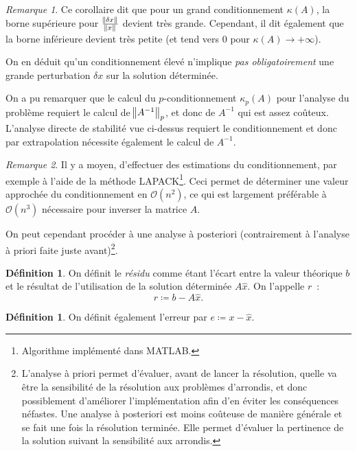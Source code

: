 \documentclass{article}
\theoremstyle{definition}
\newtheorem{déf}[thm]{Définition}
\theoremstyle{remark}
\newtheorem*{rmq}{Remarque}
\begin{document}
		\begin{rmq} Ce corollaire dit que pour un grand conditionnement $\kappa(A)$, la borne supérieure pour $\frac {\norm {\delta x}}{\norm x}$ devient très
		grande. Cependant, il dit également que la borne inférieure devient très petite (et tend vers 0 pour $\kappa(A) \to +\infty$).

		On en déduit qu'un conditionnement élevé n'implique \emph{pas obligatoirement} une grande perturbation $\delta x$ sur la solution déterminée.
		\end{rmq}

		On a pu remarquer que le calcul du $p$-conditionnement $\kappa_p(A)$ pour l'analyse du problème requiert le calcul de $\norm {A^{-1}}_p$, et donc de
		$A^{-1}$ qui est assez coûteux. L'analyse directe de stabilité vue ci-dessus requiert le conditionnement et donc par extrapolation nécessite également
		le calcul de $A^{-1}$. 

		\begin{rmq} Il y a moyen, d'effectuer des estimations du conditionnement, par exemple à l'aide de la méthode LAPACK\footnote{Algorithme implémenté dans
		MATLAB.}. Ceci permet de déterminer une valeur approchée du conditionnement en $\mathcal O(n^2)$, ce qui est largement préférable à $\mathcal O(n^3)$
		nécessaire pour inverser la matrice $A$.
		\end{rmq}

		On peut cependant procéder à une analyse à posteriori (contrairement à l'analyse à priori faite juste avant)\footnote{L'analyse à priori permet d'évaluer,
		avant de lancer la résolution, quelle va être la sensibilité de la résolution aux problèmes d'arrondis, et donc possiblement d'améliorer l'implémentation
		afin d'en éviter les conséquences néfastes. Une analyse à posteriori est moins coûteuse de manière générale et se fait une fois la résolution terminée.
		Elle permet d'évaluer la pertinence de la solution suivant la sensibilité aux arrondis.}.

		\begin{déf} On définit le \emph{résidu} comme étant l'écart entre la valeur théorique $b$ et le résultat de l'utilisation de la solution déterminée
		$A\widehat x$. On l'appelle $r$~:
		\[r \coloneqq b - A\widehat x.\]
		\end{déf}

		\begin{déf} On définit également l'erreur par $e \coloneqq x - \widehat x$. \end{déf}
\end{document}

